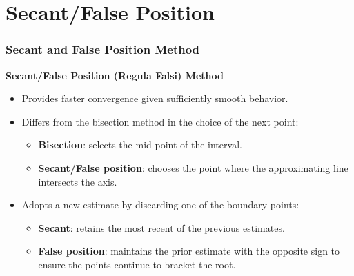   \section{Secant/False Position}
  \begin{frame}[fragile]
    \frametitle{Secant and False Position Method}
  
    \textbf{Secant/False Position (Regula Falsi) Method}
      \begin{itemize}
        \item Provides faster convergence given sufficiently smooth behavior.
        \item Differs from the bisection method in the choice of the next point:
        \begin{itemize}
          \item \textbf{Bisection}: selects the mid-point of the interval.
          \item \textbf{Secant/False position}: chooses the point where the approximating line intersects the axis.
        \end{itemize}
        \item Adopts a new estimate by discarding one of the boundary points:
        \begin{itemize}
          \item \textbf{Secant}: retains the most recent of the previous estimates.
          \item \textbf{False position}: maintains the prior estimate with the opposite sign to ensure the points continue to bracket the root.
        \end{itemize}
      \end{itemize}
  \end{frame}
  
